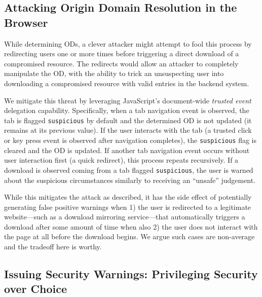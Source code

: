 \subsection{Attacking Origin Domain Resolution in the Browser}

While determining ODs, a clever attacker might attempt to fool this process by
redirecting users one or more times before triggering a direct download of a
compromised resource. The redirects would allow an attacker to completely
manipulate the OD, with the ability to trick an unsuspecting user into
downloading a compromised resource with valid entries in the backend system.

We mitigate this threat by leveraging JavaScript's document-wide \emph{trusted
event}~\cite{TrustedEvents} delegation capability. Specifically, when a tab
navigation event is observed, the tab is flagged \texttt{suspicious} by default
and the determined OD is not updated (\ie it remains at its previous value). If
the user interacts with the tab (\ie a trusted click or key press event is
observed after navigation completes), the \texttt{suspicious} flag is cleared
and the OD is updated. If another tab navigation event occurs without user
interaction first (\eg a quick redirect), this process repeats recursively. If a
download is observed coming from a tab flagged \texttt{suspicious}, the user is
warned about the suspicious circumstances similarly to receiving an ``unsafe''
judgement.

While this mitigates the attack as described, it has the side effect of
potentially generating false positive warnings when 1) the user is redirected to
a legitimate website---such as a download mirroring service---that automatically
triggers a download after some amount of time when also 2) the user does not
interact with the page at all before the download begins. We argue such cases
are non-average and the tradeoff here is worthy.

\subsection{Issuing Security Warnings: Privileging Security over Choice}


